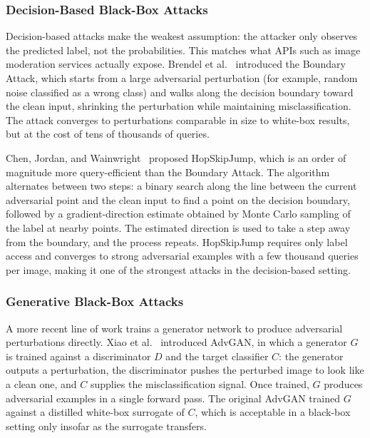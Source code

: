 \subsubsection{Decision-Based Black-Box Attacks}

Decision-based attacks make the weakest assumption: the attacker only observes the predicted label, not the probabilities. This matches what APIs such as image moderation services actually expose. Brendel et al.~\cite{brendel2018boundary} introduced the Boundary Attack, which starts from a large adversarial perturbation (for example, random noise classified as a wrong class) and walks along the decision boundary toward the clean input, shrinking the perturbation while maintaining misclassification. The attack converges to perturbations comparable in size to white-box results, but at the cost of tens of thousands of queries.

Chen, Jordan, and Wainwright~\cite{chen2020hopskipjump} proposed HopSkipJump, which is an order of magnitude more query-efficient than the Boundary Attack. The algorithm alternates between two steps: a binary search along the line between the current adversarial point and the clean input to find a point on the decision boundary, followed by a gradient-direction estimate obtained by Monte Carlo sampling of the label at nearby points. The estimated direction is used to take a step away from the boundary, and the process repeats. HopSkipJump requires only label access and converges to strong adversarial examples with a few thousand queries per image, making it one of the strongest attacks in the decision-based setting.

\subsubsection{Generative Black-Box Attacks}

A more recent line of work trains a generator network to produce adversarial perturbations directly. Xiao et al.~\cite{xiao2018advgan} introduced AdvGAN, in which a generator $G$ is trained against a discriminator $D$ and the target classifier $C$: the generator outputs a perturbation, the discriminator pushes the perturbed image to look like a clean one, and $C$ supplies the misclassification signal. Once trained, $G$ produces adversarial examples in a single forward pass. The original AdvGAN trained $G$ against a distilled white-box surrogate of $C$, which is acceptable in a black-box setting only insofar as the surrogate transfers.

